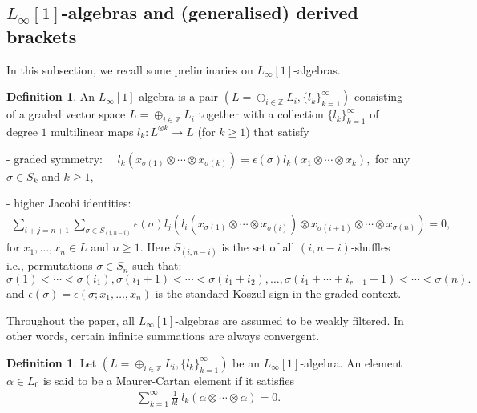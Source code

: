 \documentclass[12pt]{amsart}
\theoremstyle{definition}
\newtheorem{defn}[theorem]{Definition}
\begin{document}
\subsection{$L_\infty[1]$-algebras and (generalised) derived brackets}
In this subsection, we recall some preliminaries on $L_\infty[1]$-algebras.
\begin{defn}
	An $L_\infty[1]$-algebra is a pair $(L = \oplus_{i \in \mathbb{Z}} L_i, \{ l_k \}_{k=1}^\infty)$ consisting of a graded vector space $L = \oplus_{i \in \mathbb{Z}} L_i$ together with a collection $\{ l_k \}_{k=1}^\infty$ of degree $1$ multilinear maps $l_k : L^{\otimes k} \rightarrow L$ (for $k \geq 1$) that satisfy
	
	
	- graded symmetry: ~~$l_k(x_{\sigma(1)}\otimes\cdots\otimes x_{\sigma(k)})=\epsilon(\sigma)l_k(x_1\otimes\cdots\otimes x_k),$ for any $\sigma\in S_k$ and $k \geq 1$,
	
	- higher Jacobi identities:
	\begin{align*}
		\sum_{i+j=n+1}\sum_{\sigma\in S_{(i,n-i)}}\epsilon(\sigma)l_j\left(l_i\left(x_{\sigma(1)}\otimes\cdots\otimes x_{\sigma(i)} \right) \otimes x_{\sigma(i+1)}\otimes \cdots\otimes x_{\sigma(n) }\right)=0,
	\end{align*}
	for $x_1, \ldots, x_n \in L$ and $n \geq 1$. Here $S_{(i,n-i)}$ is the set of all $(i, n-i)$-shuffles i.e., permutations \( \sigma \in S_n \) such that:
	\[
	\sigma(1) <   \cdots <   \sigma(i_1),
	\sigma(i_1+1) <   \cdots <   \sigma(i_1 + i_2),  \dots,
	\sigma(i_1 + \cdots + i_{r-1} + 1) <   \cdots <   \sigma(n).
	\] and $\epsilon (\sigma) = \epsilon (\sigma; x_1, \ldots, x_n)$ is the standard Koszul sign in the graded context.
\end{defn}

Throughout the paper, all $L_\infty[1]$-algebras are assumed to be weakly filtered. In other words, certain infinite summations are always convergent.

\begin{defn}
	Let $(L = \oplus_{i \in \mathbb{Z}} L_i, \{ l_k \}_{k=1}^\infty)$  be an $L_\infty[1]$-algebra. An element $\alpha \in L_0$ is said to be a Maurer-Cartan element if it satisfies
	\begin{align*}
		\sum_{k=1}^\infty \frac{1}{k !} ~\! l_k (\alpha\otimes \cdots\otimes \alpha) = 0.
	\end{align*}
\end{defn}
\end{document}
